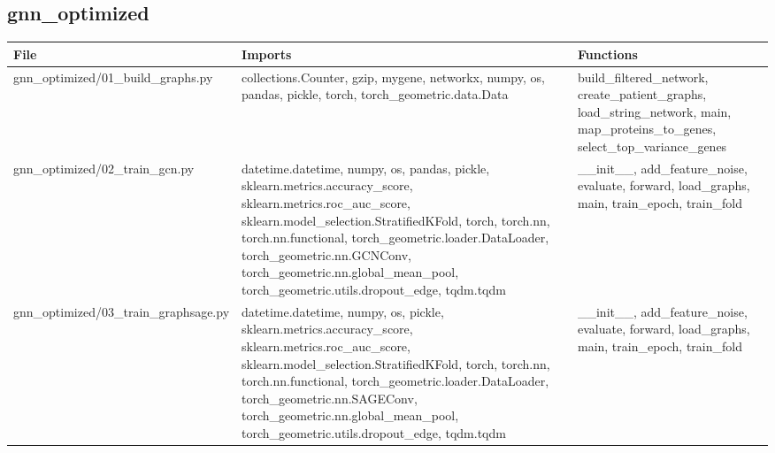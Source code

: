 \documentclass[11pt]{article}
\begin{document}
\subsection{gnn\_optimized}
\begin{longtable}{p{}p{}p{}}
\textbf{File} & \textbf{Imports} & \textbf{Functions} \\ \hline
gnn\_optimized/01\_build\_graphs.py & collections.Counter, gzip, mygene, networkx, numpy, os, pandas, pickle, torch, torch\_geometric.data.Data & build\_filtered\_network, create\_patient\_graphs, load\_string\_network, main, map\_proteins\_to\_genes, select\_top\_variance\_genes \\
gnn\_optimized/02\_train\_gcn.py & datetime.datetime, numpy, os, pandas, pickle, sklearn.metrics.accuracy\_score, sklearn.metrics.roc\_auc\_score, sklearn.model\_selection.StratifiedKFold, torch, torch.nn, torch.nn.functional, torch\_geometric.loader.DataLoader, torch\_geometric.nn.GCNConv, torch\_geometric.nn.global\_mean\_pool, torch\_geometric.utils.dropout\_edge, tqdm.tqdm & \_\_init\_\_, add\_feature\_noise, evaluate, forward, load\_graphs, main, train\_epoch, train\_fold \\
gnn\_optimized/03\_train\_graphsage.py & datetime.datetime, numpy, os, pickle, sklearn.metrics.accuracy\_score, sklearn.metrics.roc\_auc\_score, sklearn.model\_selection.StratifiedKFold, torch, torch.nn, torch.nn.functional, torch\_geometric.loader.DataLoader, torch\_geometric.nn.SAGEConv, torch\_geometric.nn.global\_mean\_pool, torch\_geometric.utils.dropout\_edge, tqdm.tqdm & \_\_init\_\_, add\_feature\_noise, evaluate, forward, load\_graphs, main, train\_epoch, train\_fold \\
\end{longtable}
\end{document}
